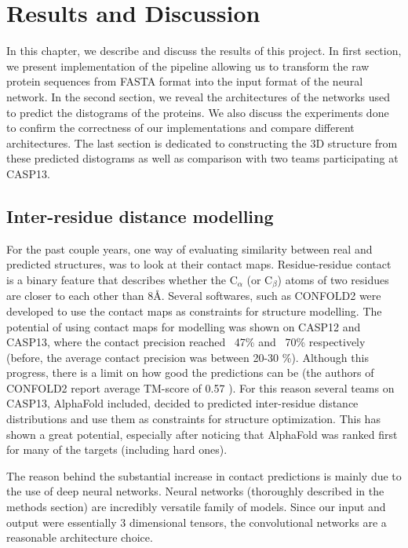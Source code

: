 \chapter{Results and Discussion}
In this chapter, we describe and discuss the results of this project.
In first section, we present implementation of the pipeline allowing us to transform the raw protein sequences from FASTA format into the input format of the neural network.
In the second section, we reveal the architectures of the networks used to predict the distograms of the proteins.
We also discuss the experiments done to confirm the correctness of our implementations and compare different architectures.
The last section is dedicated to constructing the 3D structure from these predicted distograms as well as comparison with two teams participating at CASP13.



\newpage
\section{Inter-residue distance modelling}

For the past couple years, one way of evaluating similarity between real and predicted structures, was to look at their contact maps. Residue-residue contact is a binary feature that describes whether the C$_\alpha$ (or C$_\beta$) atoms of two residues are closer to each other than 8\AA. Several softwares, such as CONFOLD2 \cite{confold, confold2} were developed to use the contact maps as constraints for structure modelling. The potential of using contact maps for modelling was shown on CASP12 and CASP13, where the contact precision reached ~47\% and ~70\% respectively (before, the average contact precision was between 20-30 \%). Although this progress, there is a limit on how good the predictions can be (the authors of CONFOLD2 report average TM-score of 0.57 \cite{confold2}). For this reason several teams on CASP13, AlphaFold included, decided to predicted inter-residue distance distributions and use them as constraints for structure optimization. This has shown a great potential, especially after noticing that AlphaFold was ranked first for many of the targets (including hard ones).

The reason behind the substantial increase in contact predictions is mainly due to the use of deep neural networks. Neural networks (thoroughly described in the methods section) are incredibly versatile family of models. Since our input and output were essentially 3 dimensional tensors, the convolutional networks are a reasonable architecture choice. 


